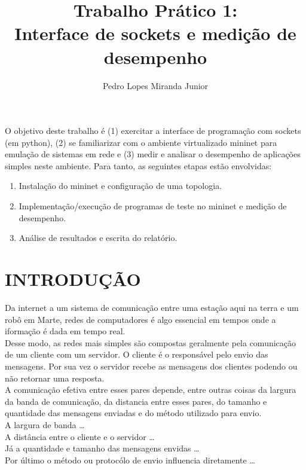 \documentclass[12pt]{article}
\title{Trabalho Prático 1: \\Interface de sockets e medição de desempenho}
\author{Pedro Lopes Miranda Junior}
\begin{document}
\maketitle

\begin{resumo}
  O objetivo deste trabalho é (1) exercitar a interface de programação com sockets (em python),
  (2) se familiarizar com o ambiente virtualizado mininet para emulação de sistemas em rede e
  (3) medir e analisar o desempenho de aplicações simples neste ambiente.
  Para tanto, as seguintes etapas estão envolvidas:
  \begin{enumerate}
  \item Instalação do mininet e configuração de uma topologia.
  \item Implementação/execução de programas de teste no mininet e medição de desempenho.
  \item Análise de resultados e escrita do relatório.
  \end{enumerate}
\end{resumo}

\section{INTRODUÇÃO}
\label{introducao}
Da internet a um sistema de comunicação entre uma estação aqui na terra e um robô em Marte,
redes de computadores é algo essencial em tempos onde a iformação é dada em tempo real.\\
Desse modo, as redes mais simples são compostas geralmente pela comunicação de um cliente com um servidor.
O cliente é o responsável pelo envio das mensagens. Por sua vez o servidor recebe as mensagens dos clientes
podendo ou não retornar uma resposta. \\

A comunicação efetiva entre esses pares depende, entre outras coisas da largura da banda de comunicação,
da distancia entre esses pares, do tamanho e quantidade das mensagens enviadas e do método utilizado para envio.\\

A largura de banda \ldots \\ %
A distância entre o cliente e o servidor \ldots \\ %
Já a quantidade e tamanho das mensagens envidas \ldots \\ %
Por último o método ou protocólo de envio influencia diretamente \ldots \\ %
\end{document}
